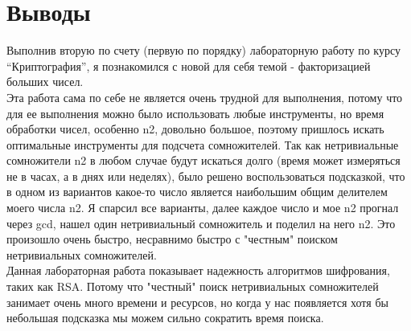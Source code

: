 \section{Выводы}
Выполнив вторую по счету (первую по порядку) лабораторную работу по курсу \enquote{Криптография}, я познакомился с новой для себя темой - факторизацией больших чисел.\\

Эта работа сама по себе не является очень трудной для выполнения, потому что для ее выполнения можно было использовать любые инструменты, но время обработки чисел, особенно n2, довольно большое, поэтому пришлось искать оптимальные инструменты для подсчета сомножителей. Так как нетривиальные сомножители n2 в любом случае будут искаться долго (время может измеряться не в часах, а в днях или неделях), было решено воспользоваться подсказкой, что в одном из вариантов какое-то число является наибольшим общим делителем моего числа n2. Я спарсил все варианты, далее каждое число и мое n2 прогнал через gcd, нашел один нетривиальный сомножитель и поделил на него n2. Это произошло очень быстро, несравнимо быстро с "честным" поиском нетривиальных сомножителей.\\

Данная лабораторная работа показывает надежность алгоритмов шифрования, таких как RSA. Потому что "честный" поиск нетривиальных сомножителей занимает очень много времени и ресурсов, но когда у нас появляется хотя бы небольшая подсказка мы можем сильно сократить время поиска.


